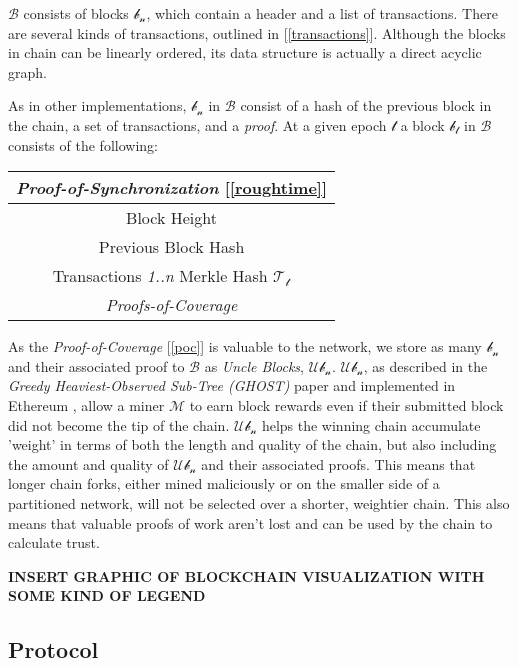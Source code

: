 \documentclass[letterpaper,11pt]{article}
\begin{document}
$\mathcal{B}$ consists of blocks $\mathcal{b_n}$, which contain a header and a list of transactions. There are several kinds of transactions, outlined in [\ref{transactions}]. Although the blocks in chain can be linearly ordered, its data structure is actually a direct acyclic graph.\newline

As in other implementations, $\mathcal{b_n}$ in $\mathcal{B}$ consist of a hash of the previous block in the chain, a set of transactions, and a \textit{proof}. At a given epoch $\mathcal{t}$ a block $\mathcal{b_t}$ in $\mathcal{B}$ consists of the following:

\begin{center}
	\begin{tabular}{|c|}
		\hline
		 \textit{Proof-of-Synchronization} [\ref{roughtime}]\\
		 \hline
		 Block Height \\
		\hline
		 Previous Block Hash \\
		 \hline
		 Transactions \textit{1..n} Merkle Hash $\mathcal{T_t}$ \\
		 \hline
		 \textit{Proofs-of-Coverage} \\
		 \hline
	\end{tabular}
\end{center}

As the \textit{Proof-of-Coverage} [\ref{poc}] is valuable to the network, we store as many $\mathcal{b_n}$ and their associated proof to $\mathcal{B}$ as \textit{Uncle Blocks}, $\mathcal{Ub_n}$. $\mathcal{Ub_n}$, as described in the \textit{Greedy Heaviest-Observed Sub-Tree (GHOST)} \cite{ghost} paper and implemented in Ethereum \cite{ethereum}, allow a miner $\mathcal{M}$ to earn block rewards even if their submitted block did not become the tip of the chain. $\mathcal{Ub_n}$ helps the winning chain accumulate 'weight' in terms of both the length and quality of the chain, but also including the amount and quality of $\mathcal{Ub_n}$ and their associated proofs. This means that longer chain forks, either mined maliciously or on the smaller side of a partitioned network, will not be selected over a shorter, weightier chain. This also means that valuable proofs of work aren't lost and can be used by the chain to calculate trust.\newline

\textbf{INSERT GRAPHIC OF BLOCKCHAIN VISUALIZATION WITH SOME KIND OF LEGEND}

\subsection{Protocol}
\end{document}
